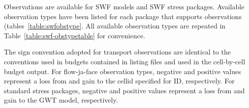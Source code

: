 Observations are available for SWF models and SWF stress packages. Available observation types have been listed for each package that supports observations (tables~\ref{table:swfobstype}. All available observation types are repeated in Table~\ref{table:swf-obstypetable} for convenience. 

The sign convention adopted for transport observations are identical to the conventions used in budgets contained in listing files and used in the cell-by-cell budget output. For flow-ja-face observation types, negative and positive values represent a loss from and gain to the cellid specified for ID, respectively. For standard stress packages, negative and positive values represent a loss from and gain to the GWT model, respectively.

\FloatBarrier

\FloatBarrier
